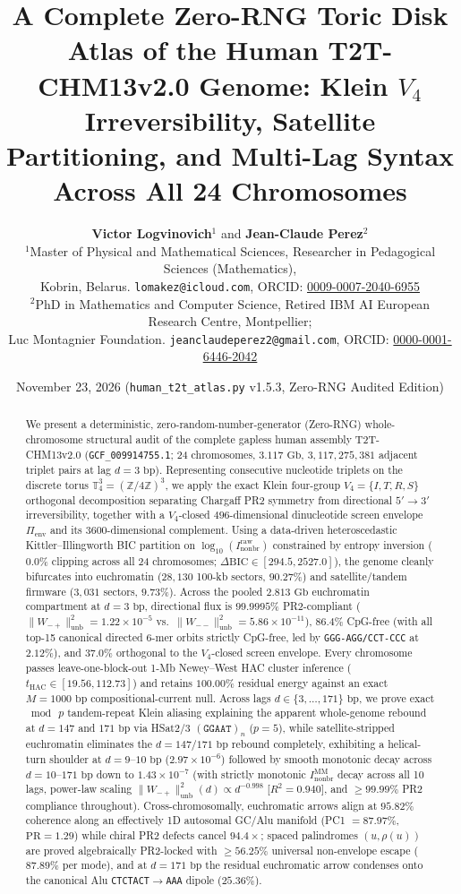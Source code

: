 \documentclass[11pt,a4paper]{article}
\title{\textbf{A Complete Zero-RNG Toric Disk Atlas of the Human T2T-CHM13v2.0 Genome: Klein $V_4$ Irreversibility, Satellite Partitioning, and Multi-Lag Syntax Across All 24 Chromosomes}}
\author{%
  \textbf{Victor Logvinovich}$^{1}$ and \textbf{Jean-Claude Perez}$^{2}$\\[6pt]
  \small $^{1}$Master of Physical and Mathematical Sciences, Researcher in Pedagogical Sciences (Mathematics),\\
  \small Kobrin, Belarus. \texttt{lomakez@icloud.com}, ORCID: \href{https://orcid.org/0009-0007-2040-6955}{0009-0007-2040-6955}\\[3pt]
  \small $^{2}$PhD in Mathematics and Computer Science, Retired IBM AI European Research Centre, Montpellier;\\
  \small Luc Montagnier Foundation. \texttt{jeanclaudeperez2@gmail.com}, ORCID: \href{https://orcid.org/0000-0001-6446-2042}{0000-0001-6446-2042}
}
\date{November 23, 2026 \quad(\texttt{human\_t2t\_atlas.py} v1.5.3, Zero-RNG Audited Edition)}
\newcommand{\Ttorus}{\mathbb{T}_4^3}
\newcommand{\Wmp}{W_{-+}}
\newcommand{\Wmm}{W_{--}}
\newcommand{\Pienv}{\Pi_{\mathrm{env}}}
\newcommand{\Inb}{I_{\mathrm{nonbr}}^{\mathrm{MM}}}
\newcommand{\Inbraw}{I_{\mathrm{nonbr}}^{\mathrm{raw}}}
\newcommand{\dBIC}{\Delta\mathrm{BIC}}
\begin{document}
\maketitle

\begin{abstract}
We present a deterministic, zero-random-number-generator (Zero-RNG) whole-chromosome structural audit of the complete gapless human assembly T2T-CHM13v2.0 (\texttt{GCF\_009914755.1}; 24 chromosomes, $3.117\text{ Gb}$, $3{,}117{,}275{,}381$ adjacent triplet pairs at lag $d=3\text{ bp}$). Representing consecutive nucleotide triplets on the discrete torus $\Ttorus = (\mathbb{Z}/4\mathbb{Z})^3$, we apply the exact Klein four-group $V_4 = \{I, T, R, S\}$ orthogonal decomposition separating Chargaff PR2 symmetry from directional $5'\!\to 3'$ irreversibility, together with a $V_4$-closed $496$-dimensional dinucleotide screen envelope $\Pienv$ and its $3600$-dimensional complement. Using a data-driven heteroscedastic Kittler--Illingworth BIC partition on $\log_{10}(\Inbraw)$ constrained by entropy inversion ($0.0\%$ clipping across all 24 chromosomes; $\dBIC \in [294.5, 2527.0]$), the genome cleanly bifurcates into euchromatin ($28{,}130$ 100-kb sectors, $90.27\%$) and satellite/tandem firmware ($3{,}031$ sectors, $9.73\%$). Across the pooled $2.813\text{ Gb}$ euchromatin compartment at $d=3\text{ bp}$, directional flux is $99.9995\%$ PR2-compliant ($\|\Wmp\|^2_{\mathrm{unb}} = 1.22\times 10^{-5}$ vs.\ $\|\Wmm\|^2_{\mathrm{unb}} = 5.86\times 10^{-11}$), $86.4\%$ CpG-free (with all top-15 canonical directed 6-mer orbits strictly CpG-free, led by \texttt{GGG-AGG/CCT-CCC} at $2.12\%$), and $37.0\%$ orthogonal to the $V_4$-closed screen envelope. Every chromosome passes leave-one-block-out 1-Mb Newey--West HAC cluster inference ($t_{\mathrm{HAC}} \in [19.56, 112.73]$) and retains $100.00\%$ residual energy against an exact $M=1000\text{ bp}$ compositional-current null. Across lags $d \in \{3,\dots,171\}\text{ bp}$, we prove exact $\bmod\,p$ tandem-repeat Klein aliasing explaining the apparent whole-genome rebound at $d=147$ and $171\text{ bp}$ via HSat2/3 $(\texttt{GGAAT})_n$ ($p=5$), while satellite-stripped euchromatin eliminates the $d=147/171\text{ bp}$ rebound completely, exhibiting a helical-turn shoulder at $d=9\text{--}10\text{ bp}$ ($2.97\times 10^{-6}$) followed by smooth monotonic decay across $d=10\text{--}171\text{ bp}$ down to $1.43\times 10^{-7}$ (with strictly monotonic $\Inb$ decay across all 10 lags, power-law scaling $\|\Wmp\|^2_{\mathrm{unb}}(d)\propto d^{-0.998}$ [$R^2=0.940$], and $\ge 99.99\%$ PR2 compliance throughout). Cross-chromosomally, euchromatic arrows align at $95.82\%$ coherence along an effectively 1D autosomal GC/Alu manifold (PC1 $=87.97\%$, $\mathrm{PR}=1.29$) while chiral PR2 defects cancel $94.4\times$; spaced palindromes $(u,\rho(u))$ are proved algebraically PR2-locked with $\ge 56.25\%$ universal non-envelope escape ($87.89\%$ per mode), and at $d=171\text{ bp}$ the residual euchromatic arrow condenses onto the canonical Alu \texttt{CTCTACT}$\to$\texttt{AAA} dipole ($25.36\%$).
\end{abstract}
\end{document}
